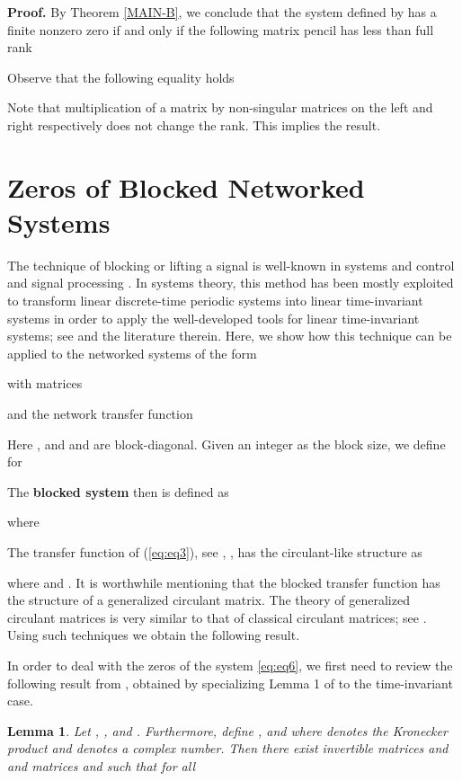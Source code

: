 \documentclass[twocolumn]{autart}    \usepackage{amsmath}
\newtheorem{lemma}{Lemma}
\begin{document}
\noindent \textbf{Proof.}
By Theorem \ref{MAIN-B}, we  conclude that  the  system defined by  has a finite nonzero zero  if and only if the following matrix pencil has less than full rank

Observe that the following equality holds

Note that multiplication of a matrix by non-singular matrices on the left and right respectively does not change the rank. This implies the result.
 \hfill 






\section{Zeros of Blocked Networked Systems}\label{sec:blocking}


The technique of blocking or lifting  a signal is well-known in
systems and control \cite{chenB95} and signal processing
\cite{vaid93}. In systems theory,  this  method
has been
mostly  exploited to  transform linear discrete-time periodic
systems into
linear time-invariant systems in order to apply the well-developed  tools for  linear time-invariant systems; see
\cite{bittanti09} and the literature therein. Here, we show how this
technique can be applied to the networked  systems of the form

with matrices

and the  network transfer function

Here ,  and  and  are block-diagonal.
Given an integer  as the block size,  we define for 
 
The \textbf{blocked system}  then is defined as \cite{bittanti09}

where

The transfer function
 of (\ref{eq:eq3}),
 see \cite{bittanti09}, \cite{Khargoneckar85}, has the circulant-like
 structure as

{\footnotesize
 }
where  and
.
It is worthwhile mentioning  that the blocked transfer function has the
structure of a generalized circulant matrix.  The theory of generalized
circulant matrices is very similar to that of classical circulant
matrices; see \cite{davis}. Using such techniques we obtain the following result.


In order to deal with the zeros of the system \eqref{eq:eq6},  we  first  need to review the  following result  from \cite{Varga2003}, obtained by specializing Lemma 1 of \cite{Varga2003} to the time-invariant case.
\begin{lemma}\label{lemvarga} \cite{Varga2003}
Let , ,  and . Furthermore,  define ,  and
  where
  denotes the Kronecker product and  denotes a complex number. Then there exist invertible  matrices  and  and  matrices  and    such that for all 

\end{lemma}
\end{document}
